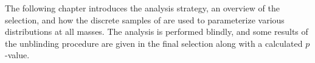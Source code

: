 The following chapter introduces the analysis strategy, an overview of the selection, and how the
discrete samples of \btokstrdb are used to parameterize various distributions at all masses.
The analysis is performed blindly, and some results of the unblinding procedure are given in the final
selection along with a calculated $p$-value.











